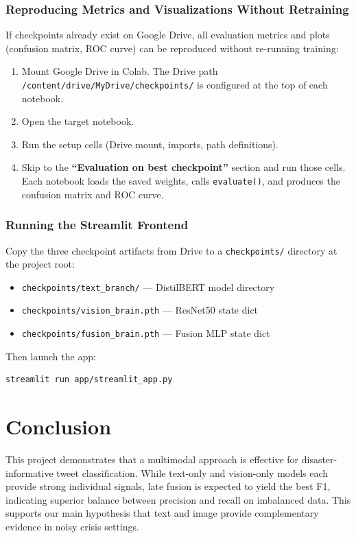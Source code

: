 \documentclass[11pt,letterpaper]{article}
\begin{document}
\subsubsection*{Reproducing Metrics and Visualizations Without Retraining}
If checkpoints already exist on Google Drive, all evaluation metrics and plots (confusion matrix, ROC curve) can be reproduced without re-running training:
\begin{enumerate}
    \item Mount Google Drive in Colab. The Drive path \texttt{/content/drive/MyDrive/checkpoints/} is configured at the top of each notebook.
    \item Open the target notebook.
    \item Run the setup cells (Drive mount, imports, path definitions).
    \item Skip to the \textbf{``Evaluation on best checkpoint''} section and run those cells. Each notebook loads the saved weights, calls \texttt{evaluate()}, and produces the confusion matrix and ROC curve.
\end{enumerate}

\subsubsection*{Running the Streamlit Frontend}
Copy the three checkpoint artifacts from Drive to a \texttt{checkpoints/} directory at the project root:
\begin{itemize}
    \item \texttt{checkpoints/text\_branch/} --- DistilBERT model directory
    \item \texttt{checkpoints/vision\_brain.pth} --- ResNet50 state dict
    \item \texttt{checkpoints/fusion\_brain.pth} --- Fusion MLP state dict
\end{itemize}
Then launch the app:
\begin{verbatim}
streamlit run app/streamlit_app.py
\end{verbatim}

\section{Conclusion}
This project demonstrates that a multimodal approach is effective for disaster-informative tweet classification. While text-only and vision-only models each provide strong individual signals, late fusion is expected to yield the best F1, indicating superior balance between precision and recall on imbalanced data. This supports our main hypothesis that text and image provide complementary evidence in noisy crisis settings.
\end{document}
